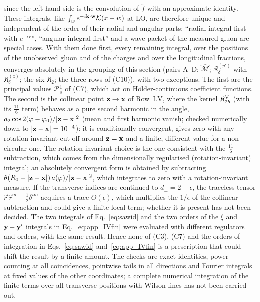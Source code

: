 since the left-hand side is the convolution of $\hat f$ with an approximate identity. These integrals, like $\int_we^{-i\mathbf{k}\cdot\mathbf{w}}\mathcal{K}(x-w)$ at LO, are therefore unique and independent of the order of their radial and angular parts; ``radial integral first with $e^{-\epsilon r}$'', ``angular integral first'' and a wave packet of the measured gluon are special cases. With them done first, every remaining integral, over the positions of the unobserved gluon and of the charges and over the longitudinal fractions, converges absolutely in the grouping of this section (pairs A--D; $\widehat{\mathcal M}$; $\mathfrak K^{(y')}_\delta$ with $\mathfrak K^{(z)}_\delta$; the six $\mathfrak K_2$; the three rows of (C10)), with two exceptions. The first are the principal values $\mathcal P\frac1s$ of (C7), which act on H\"older-continuous coefficient functions. The second is the collinear point $\mathbf{z}\to\mathbf{x}$ of Row~I.V, where the kernel $\mathfrak K^{\rm V}_{2b}$ (with its $\frac{11}{6}$ term) behaves as a pure second harmonic in the angle, $a_2\cos2(\varphi-\varphi_0)/|\mathbf{z}-\mathbf{x}|^2$ (mean and first harmonic vanish; checked numerically down to $|\mathbf{z}-\mathbf{x}|=10^{-4}$): it is conditionally convergent, gives zero with any rotation-invariant cut-off around $\mathbf{z}=\mathbf{x}$ and a finite, different value for a non-circular one. The rotation-invariant choice is the one consistent with the $\frac{11}{6}$ subtraction, which comes from the dimensionally regularised (rotation-invariant) integral; an absolutely convergent form is obtained by subtracting $\theta(R_0-|\mathbf{z}-\mathbf{x}|)\,a(\varphi)/|\mathbf{z}-\mathbf{x}|^2$, which integrates to zero with a rotation-invariant measure. If the transverse indices are continued to $d_\perp=2-\epsilon$, the traceless tensor $\hat r^i\hat r^m-\frac12\delta^{im}$ acquires a trace $O(\epsilon)$, which multiplies the $1/\epsilon$ of the collinear subtraction and could give a finite local term; whether it is present has not been decided. The two integrals of Eq.~\eqref{eq:sawid} and the two orders of the $\xi$ and $\mathbf{y}-\mathbf{y}'$ integrals in Eq.~\eqref{eq:app_IVfin} were evaluated with different regulators and orders, with the same result. Hence none of (C3), (C7) and the orders of integration in Eqs.~\eqref{eq:sawid} and~\eqref{eq:app_IVfin} is a prescription that could shift the result by a finite amount. The checks are exact identities, power counting at all coincidences, pointwise tails in all directions and Fourier integrals at fixed values of the other coordinates; a complete numerical integration of the finite terms over all transverse positions with Wilson lines has not been carried out.

